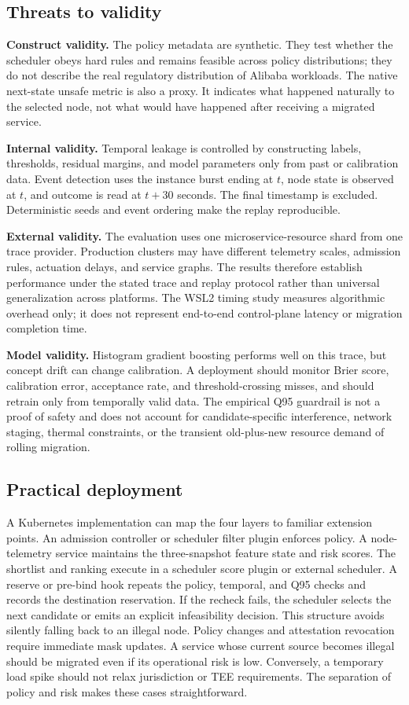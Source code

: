 \subsection{Threats to validity}

\textbf{Construct validity.} The policy metadata are synthetic. They test whether the scheduler obeys hard rules and remains feasible across policy distributions; they do not describe the real regulatory distribution of Alibaba workloads. The native next-state unsafe metric is also a proxy. It indicates what happened naturally to the selected node, not what would have happened after receiving a migrated service.

\textbf{Internal validity.} Temporal leakage is controlled by constructing labels, thresholds, residual margins, and model parameters only from past or calibration data. Event detection uses the instance burst ending at $t$, node state is observed at $t$, and outcome is read at $t+30$ seconds. The final timestamp is excluded. Deterministic seeds and event ordering make the replay reproducible.

\textbf{External validity.} The evaluation uses one microservice-resource shard from one trace provider. Production clusters may have different telemetry scales, admission rules, actuation delays, and service graphs. The results therefore establish performance under the stated trace and replay protocol rather than universal generalization across platforms. The WSL2 timing study measures algorithmic overhead only; it does not represent end-to-end control-plane latency or migration completion time.

\textbf{Model validity.} Histogram gradient boosting performs well on this trace, but concept drift can change calibration. A deployment should monitor Brier score, calibration error, acceptance rate, and threshold-crossing misses, and should retrain only from temporally valid data. The empirical Q95 guardrail is not a proof of safety and does not account for candidate-specific interference, network staging, thermal constraints, or the transient old-plus-new resource demand of rolling migration.

\subsection{Practical deployment}

A Kubernetes implementation can map the four layers to familiar extension points. An admission controller or scheduler filter plugin enforces policy. A node-telemetry service maintains the three-snapshot feature state and risk scores. The shortlist and ranking execute in a scheduler score plugin or external scheduler. A reserve or pre-bind hook repeats the policy, temporal, and Q95 checks and records the destination reservation. If the recheck fails, the scheduler selects the next candidate or emits an explicit infeasibility decision. This structure avoids silently falling back to an illegal node. Policy changes and attestation revocation require immediate mask updates. A service whose current source becomes illegal should be migrated even if its operational risk is low. Conversely, a temporary load spike should not relax jurisdiction or TEE requirements. The separation of policy and risk makes these cases straightforward.
